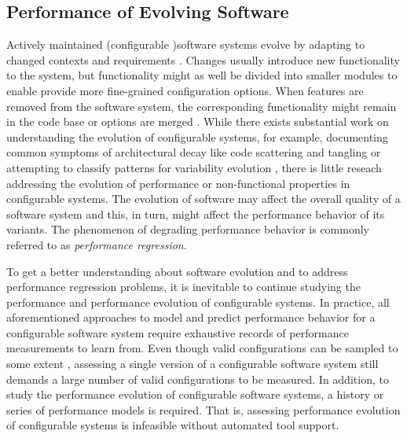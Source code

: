 \subsection{Performance of Evolving Software}

Actively maintained (configurable )software systems evolve by adapting to changed
contexts and requirements \citep{peng_analyzing_2011}. Changes usually
introduce new functionality to the system, but functionality might as well be
divided into smaller modules to enable provide more fine-grained configuration
options. When features are removed from the software system, the
corresponding functionality might remain in the code base or options are merged
\citep{apel_feature-oriented_2013}.  While there
exists substantial work on understanding the evolution of configurable systems,
for example, documenting common symptoms of architectural decay
like code scattering and tangling \citep{passos_feature_2015,zhang_variability_2013} or attempting to
classify patterns for variability evolution
\citep{seidl_co-evolution_2012,peng_analyzing_2011,passos_towards_2012}, there
is little reseach addressing the evolution of performance or non-functional
properties in configurable systems. {\color{red}The evolution of software may
affect the overall quality of a software system and this, in turn, might affect the
performance behavior of its variants. The phenomenon of degrading performance
behavior is commonly referred to as \emph{performance regression}.}

To get a better understanding about software evolution and to address
performance regression problems, it is inevitable to continue
studying the performance and performance evolution of configurable systems. In practice, all
aforementioned approaches to model and predict performance behavior for a
configurable software system require exhaustive records of performance
measurements to learn from. Even though valid configurations can be sampled to
some extent \citep{apel_feature-oriented_2013,siegmund_performance-influence_2015}, assessing a single version
of a configurable software system still demands a large number of valid configurations to be measured. In
addition, to study the performance evolution of configurable software systems,
a history or series of performance models is required. That is, assessing
performance evolution of configurable systems is infeasible without
automated tool support.

